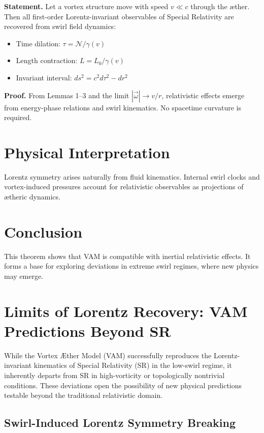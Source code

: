 \documentclass[11pt]{article}
\begin{document}
    \textbf{Statement.}
    Let a vortex structure move with speed \( v \ll c \) through the æther. Then all first-order Lorentz-invariant observables of Special Relativity are recovered from swirl field dynamics:

    \begin{itemize}
        \item Time dilation: \( \tau = \mathcal{N} / \gamma(v) \)
        \item Length contraction: \( L = L_0 / \gamma(v) \)
        \item Invariant interval: \( ds^2 = c^2 d\tau^2 - dr^2 \)
    \end{itemize}

    \textbf{Proof.}
    From Lemmas 1–3 and the limit \( |\vec{\omega}| \to v/r \), relativistic effects emerge from energy-phase relations and swirl kinematics. No spacetime curvature is required.

    \section{Physical Interpretation}
    Lorentz symmetry arises naturally from fluid kinematics. Internal swirl clocks and vortex-induced pressures account for relativistic observables as projections of ætheric dynamics.

    \section{Conclusion}
    This theorem shows that VAM is compatible with inertial relativistic effects. It forms a base for exploring deviations in extreme swirl regimes, where new physics may emerge.

    \section{Limits of Lorentz Recovery: VAM Predictions Beyond SR}

    While the Vortex Æther Model (VAM) successfully reproduces the Lorentz-invariant kinematics of Special Relativity (SR) in the low-swirl regime, it inherently departs from SR in high-vorticity or topologically nontrivial conditions. These deviations open the possibility of new physical predictions testable beyond the traditional relativistic domain.

    \subsection{Swirl-Induced Lorentz Symmetry Breaking}
\end{document}
